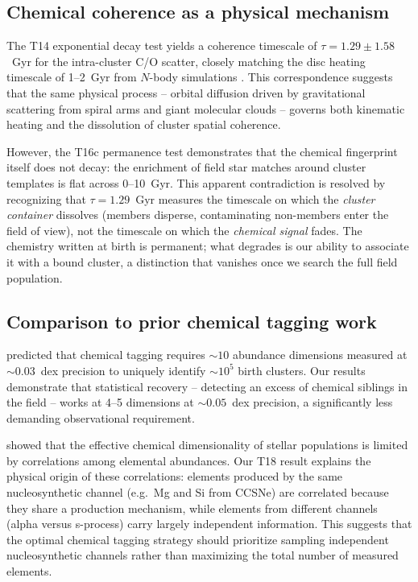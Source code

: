 \documentclass[fleqn,usenatbib]{mnras}
\newcommand{\co}{C/O\xspace}
\begin{document}
\subsection{Chemical coherence as a physical mechanism}

The T14 exponential decay test yields a coherence timescale of $\tau = 1.29 \pm 1.58$~Gyr for the intra-cluster \co scatter, closely matching the disc heating timescale of 1--2~Gyr from $N$-body simulations \citep{BinneyTremaine2008}.
This correspondence suggests that the same physical process -- orbital diffusion driven by gravitational scattering from spiral arms and giant molecular clouds -- governs both kinematic heating and the dissolution of cluster spatial coherence.

However, the T16c permanence test demonstrates that the chemical fingerprint itself does not decay: the enrichment of field star matches around cluster templates is flat across 0--10~Gyr.
This apparent contradiction is resolved by recognizing that $\tau = 1.29$~Gyr measures the timescale on which the \emph{cluster container} dissolves (members disperse, contaminating non-members enter the field of view), not the timescale on which the \emph{chemical signal} fades.
The chemistry written at birth is permanent; what degrades is our ability to associate it with a bound cluster, a distinction that vanishes once we search the full field population.

\subsection{Comparison to prior chemical tagging work}

\citet{BlandHawthorn2010} predicted that chemical tagging requires ${\sim}10$ abundance dimensions measured at ${\sim}0.03$~dex precision to uniquely identify ${\sim}10^5$ birth clusters.
Our results demonstrate that statistical recovery -- detecting an excess of chemical siblings in the field -- works at 4--5 dimensions at ${\sim}0.05$~dex precision, a significantly less demanding observational requirement.

\citet{Ting2015} showed that the effective chemical dimensionality of stellar populations is limited by correlations among elemental abundances.
Our T18 result explains the physical origin of these correlations: elements produced by the same nucleosynthetic channel (e.g.\ Mg and Si from CCSNe) are correlated because they share a production mechanism, while elements from different channels (alpha versus s-process) carry largely independent information.
This suggests that the optimal chemical tagging strategy should prioritize sampling independent nucleosynthetic channels rather than maximizing the total number of measured elements.
\end{document}
